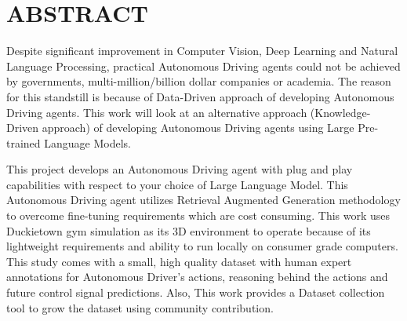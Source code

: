\chapter*{\uppercase{ABSTRACT}}
\begin{spacing}{1.5}
\begin{sloppypar}
Despite significant improvement in Computer Vision, Deep Learning and Natural
Language Processing, practical Autonomous Driving agents could not be achieved
by governments, multi-million/billion dollar companies or academia. The reason
for this standstill is because of Data-Driven approach of developing Autonomous Driving agents. This work will look at an alternative approach (Knowledge-Driven approach) of developing Autonomous Driving agents using Large Pre-trained Language Models.

This project develops an Autonomous Driving agent with plug and play capabilities with respect to your choice of Large Language Model. This Autonomous Driving agent utilizes Retrieval Augmented Generation methodology to overcome fine-tuning requirements which are cost consuming. This work uses Duckietown gym simulation as its 3D environment to operate because of its lightweight requirements and ability to run locally on consumer grade computers. This study comes with a small, high quality dataset with human expert annotations for Autonomous Driver’s actions, reasoning behind the actions and future control signal predictions. Also, This work provides a Dataset collection tool to grow the dataset using community contribution.
\end{sloppypar}
 \end{spacing}


